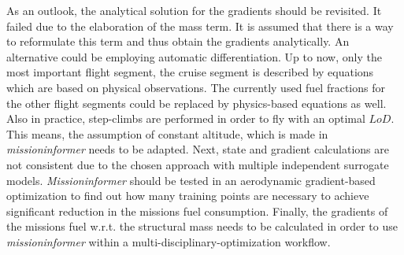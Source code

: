 As an outlook, the analytical solution for the gradients 
should be revisited. It failed due to the elaboration of the mass
term. It is assumed that 
there is a way to reformulate this term and thus obtain 
the gradients analytically. An alternative could be
employing automatic differentiation.
Up to now, only the most important flight segment, the cruise 
segment is described by equations which 
are based on physical observations. The currently 
used fuel fractions for the other  
flight segments could be replaced
by physics-based equations as well. Also in practice,
step-climbs are performed 
in order to fly with an optimal $LoD$. This means, 
the assumption of constant altitude,
which  is made in \emph{missioninformer} 
needs to be adapted. Next, state and gradient calculations are
not consistent due to the chosen approach with multiple
independent surrogate models. \emph{Missioninformer} should be 
tested in an aerodynamic gradient-based optimization 
to find out how many 
training points are necessary to achieve significant
reduction in the missions fuel consumption. Finally, 
the gradients of the missions fuel w.r.t. 
the structural mass needs to be calculated in order 
to use \emph{missioninformer} within 
a multi-disciplinary-optimization workflow.